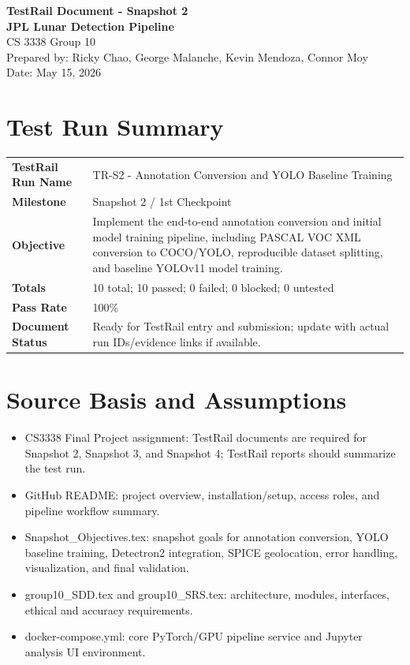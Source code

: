 \documentclass[11pt,landscape]{article}
\begin{document}
\begin{center}
{\LARGE\textbf{TestRail Document - Snapshot 2}}\\[0.3cm]
{\large\textbf{JPL Lunar Detection Pipeline}}\\
CS 3338 Group 10\\
Prepared by: Ricky Chao, George Malanche, Kevin Mendoza, Connor Moy\\
Date: May 15, 2026
\end{center}
\section*{Test Run Summary}
\begin{tabular}{p{2.2in}p{7.6in}}\toprule
\textbf{TestRail Run Name} & TR-S2 - Annotation Conversion and YOLO Baseline Training \\
\textbf{Milestone} & Snapshot 2 / 1st Checkpoint \\
\textbf{Objective} & Implement the end-to-end annotation conversion and initial model training pipeline, including PASCAL VOC XML conversion to COCO/YOLO, reproducible dataset splitting, and baseline YOLOv11 model training. \\
\textbf{Totals} & 10 total; 10 passed; 0 failed; 0 blocked; 0 untested \\
\textbf{Pass Rate} & 100\% \\
\textbf{Document Status} & Ready for TestRail entry and submission; update with actual run IDs/evidence links if available. \\
\bottomrule\end{tabular}
\section*{Source Basis and Assumptions}
\begin{itemize}[leftmargin=*]
\item CS3338 Final Project assignment: TestRail documents are required for Snapshot 2, Snapshot 3, and Snapshot 4; TestRail reports should summarize the test run.
\item GitHub README: project overview, installation/setup, access roles, and pipeline workflow summary.
\item Snapshot\_Objectives.tex: snapshot goals for annotation conversion, YOLO baseline training, Detectron2 integration, SPICE geolocation, error handling, visualization, and final validation.
\item group10\_SDD.tex and group10\_SRS.tex: architecture, modules, interfaces, ethical and accuracy requirements.
\item docker-compose.yml: core PyTorch/GPU pipeline service and Jupyter analysis UI environment.
\end{itemize}
\end{document}
